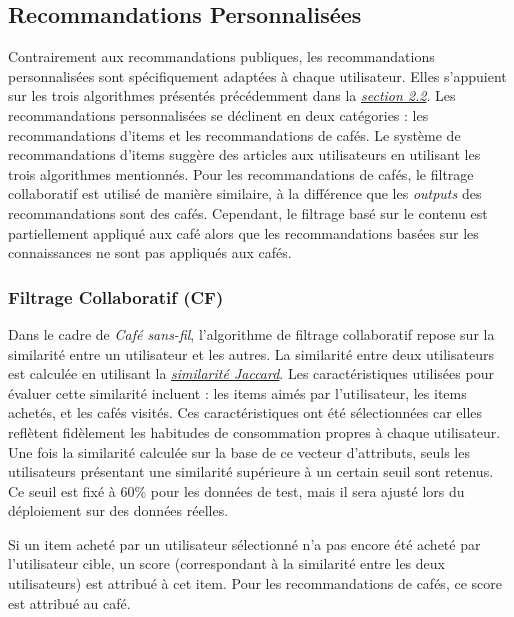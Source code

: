 \documentclass[11pt]{article}
\begin{document}
\subsection{Recommandations Personnalisées}
Contrairement aux recommandations publiques, les recommandations personnalisées sont spécifiquement adaptées à chaque utilisateur. Elles s’appuient sur les trois algorithmes présentés précédemment dans la \hyperref[2.2]{\textit{section 2.2}}. Les recommandations personnalisées se déclinent en deux catégories : les recommandations d'items et les recommandations de cafés. Le système de recommandations d'items suggère des articles aux utilisateurs en utilisant les trois algorithmes mentionnés. Pour les recommandations de cafés, le filtrage collaboratif est utilisé de manière similaire, à la différence que les \textit{outputs} des recommandations sont des cafés. Cependant, le filtrage basé sur le contenu est partiellement appliqué aux café alors que les recommandations basées sur les connaissances ne sont pas appliqués aux cafés.

\subsubsection{Filtrage Collaboratif (CF)}
Dans le cadre de \textit{Café sans-fil}, l'algorithme de filtrage collaboratif repose sur la similarité entre un utilisateur et les autres. La similarité entre deux utilisateurs est calculée en utilisant la \hyperref[jaccard]{\textit{similarité Jaccard}}. Les caractéristiques utilisées pour évaluer cette similarité incluent : les items aimés par l'utilisateur, les items achetés, et les cafés visités. Ces caractéristiques ont été sélectionnées car elles reflètent fidèlement les habitudes de consommation propres à chaque utilisateur. Une fois la similarité calculée sur la base de ce vecteur d'attributs, seuls les utilisateurs présentant une similarité supérieure à un certain seuil sont retenus. Ce seuil est fixé à 60\% pour les données de test, mais il sera ajusté lors du déploiement sur des données réelles.\

Si un item acheté par un utilisateur sélectionné n'a pas encore été acheté par l'utilisateur cible, un score (correspondant à la similarité entre les deux utilisateurs) est attribué à cet item. Pour les recommandations de cafés, ce score est attribué au café.
\end{document}
